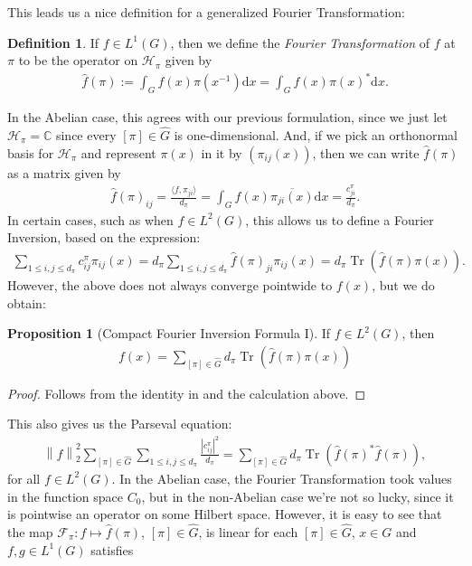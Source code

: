 \documentclass[10pt,twoside,openany,final]{memoir}
\theoremstyle{definition}
\newtheorem{proposition}[theorem]{Proposition}
\newtheorem{definition}[theorem]{Definition}
\theoremstyle{Break}
\newcommand{\lv}{\left\lVert}
\newcommand{\rv}{\right\rVert}
\newcommand{\C}{\mathbb{C}}
\newcommand{\F}{\mathcal{F}}
\newcommand{\G}{\widehat{G}}
\renewcommand{\H}{\mathcal{H}}
\renewcommand{\d}{\mathrm{d}}
\DeclareMathOperator{\tr}{Tr}
\begin{document}
This leads us a nice definition for a generalized Fourier Transformation:
\begin{definition}
	If $f \in L^1(G)$, then we define the \emph{Fourier Transformation} of $f$ at $\pi$ to be the operator on $\H_\pi$ given by
	\begin{align*}
		\widehat{f}(\pi):=\int_G f(x) \pi(x^{-1}) \d x = \int_{G}f(x) \pi(x)^* \d x.	
	\end{align*}	
\end{definition}
In the Abelian case, this agrees with our previous formulation, since we just let $\H_\pi=\C$ since every $[\pi]\in \G$ is one-dimensional. And, if we pick an orthonormal basis for $\H_\pi$ and represent $\pi(x)$ in it by $(\pi_{ij}(x))$, then we can write $\widehat{f}(\pi)$ as a matrix given by
\begin{align*}
	\widehat{f}(\pi)_{ij}=\frac{\langle f,\pi_{ji}\rangle}{d_{\pi}}=\int_G f(x) \overline{\pi_{ji}(x)}\d x = \frac{c_{ji}^\pi}{d_{\pi}}.
\end{align*}
In certain cases, such as when $f \in L^2(G)$, this allows us to define a Fourier Inversion, based on the expression:
\begin{align*}
\sum_{ 1 \leq i,j\leq d_\pi}c_{ij}^\pi \pi_{ij}(x) = d_{\pi} \sum_{1 \leq i,j \leq d_\pi}\widehat{f}(\pi)_{ji}\pi_{ij}(x) = d_\pi \tr(\widehat{f}(\pi)\pi(x)).
\end{align*}
However, the above does not always converge pointwide to $f(x)$, but we do obtain:
\begin{proposition}[Compact Fourier Inversion Formula I]
	If $f \in L^2(G)$, then 
	\begin{align*}
		f(x) = \sum_{[\pi] \in \G} d_\pi \tr(\widehat{f}(\pi)\pi(x))
	\end{align*}
	\label{invcompI}
\end{proposition}
\begin{proof}
	Follows from the identity in  and the calculation above.
\end{proof}
This also gives us the Parseval equation:
\begin{align*}
	\lv f \rv_2^2 \sum_{[\pi]\in \G}\sum_{1 \leq i,j \leq d_\pi} \frac{|c_{ij}^\pi|^2}{d_\pi}=\sum_{[\pi]\in\G} d_\pi \tr(\widehat{f}(\pi)^* \widehat{f}(\pi)),
\end{align*}
for all $f \in L^2(G)$. In the Abelian case, the Fourier Transformation took values in the function space $C_0$, but in the non-Abelian case we're not so lucky, since it is pointwise an operator on some Hilbert space. However, it is easy to see that the map $\F_{\pi} \colon f \mapsto \widehat{f}(\pi)$, $[\pi] \in \G$, is linear for each $[\pi] \in \G$, $x \in G$ and $f,g \in L^1(G)$ satisfies 
\end{document}
